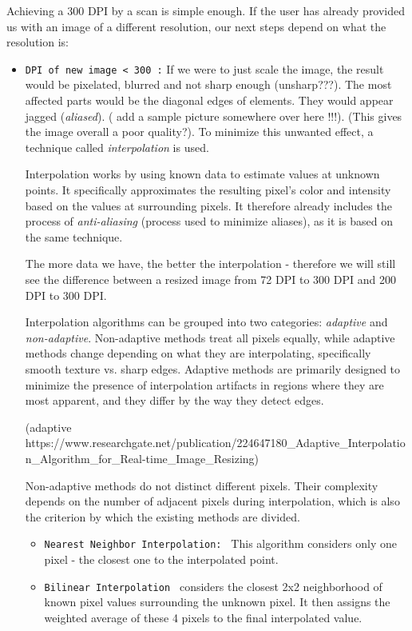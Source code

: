 Achieving a 300 DPI by a scan is simple enough. If the user has already provided us with an image of a different resolution, our next steps depend on what the resolution is:
\begin{itemize}
\item\texttt {DPI of new image < 300 :} If we were to just scale the image, the result would be pixelated, blurred and not sharp enough (unsharp???). The most affected parts would be the diagonal edges of elements. They would appear jagged (\emph{aliased}). ( add a sample picture somewhere over here !!!). (This gives the image overall a poor quality?). To minimize this unwanted effect, a technique called \emph{interpolation} is used.

Interpolation works by using known data to estimate values at unknown points. It specifically approximates the resulting pixel's color and intensity based on the values at surrounding pixels. It therefore already includes the process of \emph{anti-aliasing} (process used to minimize aliases), as it is based on the same technique.

The more data we have, the better the interpolation - therefore we will still see the difference between a resized image from 72 DPI to 300 DPI and 200 DPI to 300 DPI.

Interpolation algorithms can be grouped into two categories: \emph{adaptive} and \emph{non-adaptive}. Non-adaptive methods treat all pixels equally, while adaptive methods change depending on what they are interpolating, specifically smooth texture vs. sharp edges. Adaptive methods are primarily designed to minimize the presence of interpolation artifacts in regions where they are most apparent, and they differ by the way they detect edges.

(adaptive https://www.researchgate.net/publication/224647180_Adaptive_Interpolation_Algorithm_for_Real-time_Image_Resizing)

Non-adaptive methods do not distinct different pixels. Their complexity depends on the number of adjacent pixels during interpolation, which is also the criterion by which the existing methods are divided. 

\begin{itemize}
\item\texttt {Nearest Neighbor Interpolation: } This algorithm considers only one pixel - the closest one to the interpolated point.

\item\texttt {Bilinear Interpolation } considers the closest 2x2 neighborhood of known pixel values surrounding the unknown pixel. It then assigns the weighted average of these 4 pixels to the final interpolated value.


\end{itemize}
\end{itemize}
